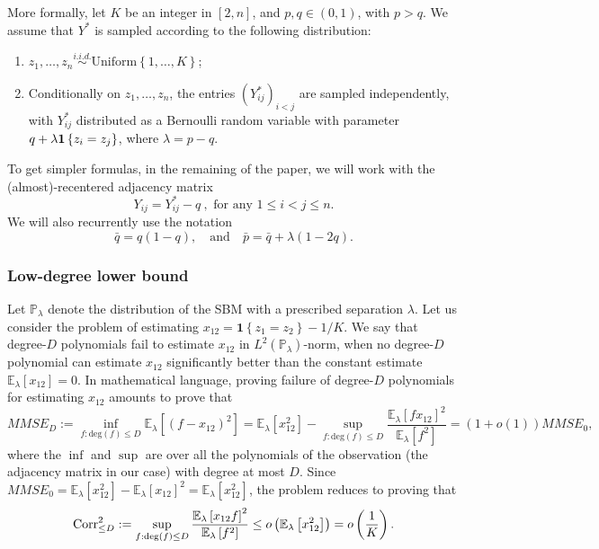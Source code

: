 \documentclass[final]{colt2026}
\newcommand{\1}{\mathbf{1}}
\newcommand{\bbE}{\mathbb{E}}
\newcommand{\bbP}{\mathbb{P}}
\newcommand{\pa}[1]{\left(#1\right)}
\newcommand{\ac}[1]{\left\{#1\right\}}
\newcommand{\cro}[1]{\left[#1\right]}
\begin{document}
More formally, let $K$ be an integer in $[2,n]$, and $p,q\in (0,1)$, with $p>q$. We assume that $Y^*$ is sampled according to the following distribution:
\vspace{-0.2cm}
\begin{enumerate}[wide,labelindent=0mm]
\setlength{\itemsep}{0pt}
\item  $z_{1},\ldots,z_{n}\stackrel{i.i.d.}{\sim} \text{Uniform}\ac{1,\ldots,K}$;
\item Conditionally on $z_{1},\ldots,z_{n}$, the entries $(Y^*_{ij})_{i<j}$ are sampled independently, with $Y^*_{ij}$ distributed as a Bernoulli random variable with parameter $q+\lambda{\bf 1}\ac{z_{i}=z_{j}}$, where $\lambda=p-q$. 
\end{enumerate}
To get simpler formulas, in the remaining of the paper, we will work with the (almost)-recentered adjacency matrix
\begin{equation}\label{eq:definition:Y}
Y_{ij} = Y^{*}_{ij}- q \ , \text{ for any }1\leq i < j \leq n.
\end{equation}
We will also recurrently use the notation
\begin{equation}\label{eq:bar-proba}
\bar q=q(1-q),\quad \text{and}\quad \bar p= \bar q +\lambda (1-2q).
\end{equation}


\subsubsection{Low-degree lower bound}
Let $\bbP_{\lambda}$ denote the distribution of the SBM with a prescribed separation $\lambda$. Let us consider the problem of estimating $x_{12}=\mathbf{1}\ac{z_1=z_2}-1/K$. 
We say that degree-$D$ polynomials fail to estimate $x_{12}$ in $L^2(\bbP_{\lambda})$-norm,  when no degree-$D$ polynomial can estimate $x_{12}$ significantly better than the constant estimate $\bbE_{\lambda}[x_{12}]=0$. In mathematical language, proving  failure of degree-$D$ polynomials for estimating $x_{12}$ amounts to prove that
\begin{equation}\label{eq:MMSE}
MMSE_{D}:=\inf_{f: \mathrm{deg}(f)\leq D} \mathbb{E}_{\lambda}\cro{(f-x_{12})^2}=\mathbb{E}_{\lambda}[x_{12}^2]- \sup_{f: \mathrm{deg}(f)\leq D}\frac{\mathbb{E}_{\lambda}[fx_{12}]^2}{\mathbb{E}_{\lambda}[f^2]}=(1+o(1))MMSE_{0},
\end{equation}
where the $\inf$ and $\sup$ are over all the polynomials of the observation (the adjacency matrix in our case) with degree at most $D$. Since $MMSE_{0}=\bbE_{\lambda}[x_{12}^2]-\bbE_{\lambda}[x_{12}]^2=\bbE_{\lambda}[x_{12}^2]$, the problem reduces to proving that
\begin{equation}\label{eq:corr:goal}
   \mathrm{Corr}_{\leq D}^2 :=   \sup_{f: \mathrm{deg}(f)\leq D}\frac{\bbE_{\lambda}\cro{x_{12}f}^2}{{\bbE_{\lambda}\cro{f^2}}} \leq  o\pa{\bbE_{\lambda}\cro{x_{12}^2}}=o\pa{1\over K}.
\end{equation}
\end{document}
